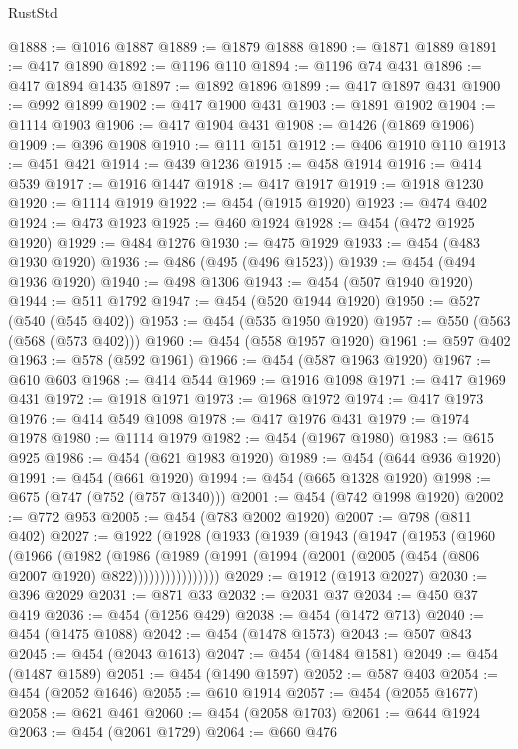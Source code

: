 \begin{lexlean}{RustStd}
\begin{coremodule}
{\begin{coremodule}
{{{{{{{{{{{{{{{{{{{{{{{{{{{{{{{{@1888 := @1016 @1887
@1889 := @1879 @1888
@1890 := @1871 @1889
@1891 := @417 @1890
@1892 := @1196 @110
@1894 := @1196 @74 @431
@1896 := @417 @1894 @1435
@1897 := @1892 @1896
@1899 := @417 @1897 @431
@1900 := @992 @1899
@1902 := @417 @1900 @431
@1903 := @1891 @1902
@1904 := @1114 @1903
@1906 := @417 @1904 @431
@1908 := @1426 (@1869 @1906)
@1909 := @396 @1908
@1910 := @111 @151
@1912 := @406 @1910 @110
@1913 := @451 @421
@1914 := @439 @1236
@1915 := @458 @1914
@1916 := @414 @539
@1917 := @1916 @1447
@1918 := @417 @1917
@1919 := @1918 @1230
@1920 := @1114 @1919
@1922 := @454 (@1915 @1920)
@1923 := @474 @402
@1924 := @473 @1923
@1925 := @460 @1924
@1928 := @454 (@472 @1925 @1920)
@1929 := @484 @1276
@1930 := @475 @1929
@1933 := @454 (@483 @1930 @1920)
@1936 := @486 (@495 (@496 @1523))
@1939 := @454 (@494 @1936 @1920)
@1940 := @498 @1306
@1943 := @454 (@507 @1940 @1920)
@1944 := @511 @1792
@1947 := @454 (@520 @1944 @1920)
@1950 := @527 (@540 (@545 @402))
@1953 := @454 (@535 @1950 @1920)
@1957 := @550 (@563 (@568 (@573 @402)))
@1960 := @454 (@558 @1957 @1920)
@1961 := @597 @402
@1963 := @578 (@592 @1961)
@1966 := @454 (@587 @1963 @1920)
@1967 := @610 @603
@1968 := @414 @544
@1969 := @1916 @1098
@1971 := @417 @1969 @431
@1972 := @1918 @1971
@1973 := @1968 @1972
@1974 := @417 @1973
@1976 := @414 @549 @1098
@1978 := @417 @1976 @431
@1979 := @1974 @1978
@1980 := @1114 @1979
@1982 := @454 (@1967 @1980)
@1983 := @615 @925
@1986 := @454 (@621 @1983 @1920)
@1989 := @454 (@644 @936 @1920)
@1991 := @454 (@661 @1920)
@1994 := @454 (@665 @1328 @1920)
@1998 := @675 (@747 (@752 (@757 @1340)))
@2001 := @454 (@742 @1998 @1920)
@2002 := @772 @953
@2005 := @454 (@783 @2002 @1920)
@2007 := @798 (@811 @402)
@2027 := @1922
    (@1928
      (@1933
        (@1939
          (@1943
            (@1947
              (@1953
                (@1960
                  (@1966
                    (@1982
                      (@1986
                        (@1989
                          (@1991 (@1994 (@2001 (@2005 (@454 (@806 @2007 @1920) @822))))))))))))))))
@2029 := @1912 (@1913 @2027)
@2030 := @396 @2029
@2031 := @871 @33
@2032 := @2031 @37
@2034 := @450 @37 @419
@2036 := @454 (@1256 @429)
@2038 := @454 (@1472 @713)
@2040 := @454 (@1475 @1088)
@2042 := @454 (@1478 @1573)
@2043 := @507 @843
@2045 := @454 (@2043 @1613)
@2047 := @454 (@1484 @1581)
@2049 := @454 (@1487 @1589)
@2051 := @454 (@1490 @1597)
@2052 := @587 @403
@2054 := @454 (@2052 @1646)
@2055 := @610 @1914
@2057 := @454 (@2055 @1677)
@2058 := @621 @461
@2060 := @454 (@2058 @1703)
@2061 := @644 @1924
@2063 := @454 (@2061 @1729)
@2064 := @660 @476
}}}}}}}}}}}}}}}}}}}}}}}}}}}}}}}}
\end{coremodule}}
\end{coremodule}
\end{lexlean}
